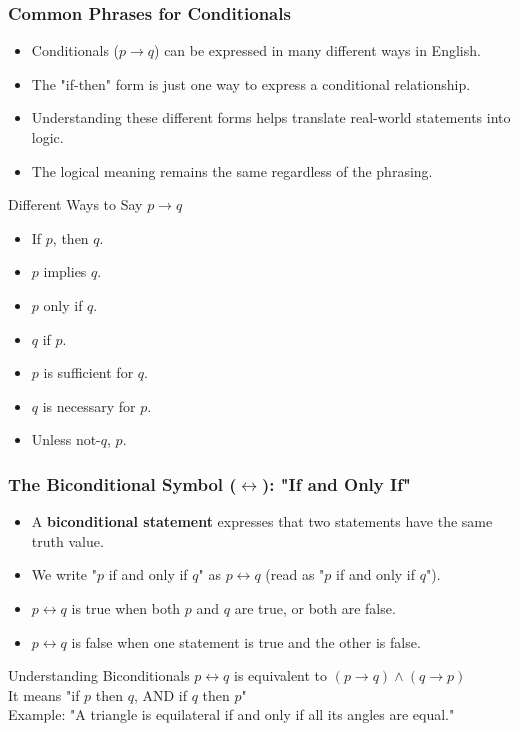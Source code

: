 \documentclass{beamer}
\begin{document}
        \begin{frame}
        \frametitle{Common Phrases for Conditionals}
        \begin{itemize}
            \item Conditionals ($p \rightarrow q$) can be expressed in many different ways in English.
            \item The "if-then" form is just one way to express a conditional relationship.
            \item Understanding these different forms helps translate real-world statements into logic.
            \item The logical meaning remains the same regardless of the phrasing.
        \end{itemize}
        
        \begin{block}{Different Ways to Say $p \rightarrow q$}
            \scriptsize
        \begin{itemize}
            \item If $p$, then $q$.
            \item $p$ implies $q$.
            \item $p$ only if $q$.
            \item $q$ if $p$.
            \item $p$ is sufficient for $q$.
            \item $q$ is necessary for $p$.
            \item Unless not-$q$, $p$.
        \end{itemize}
        \end{block}
        \end{frame}

        \begin{frame}
            \frametitle{The Biconditional Symbol ($\leftrightarrow$): "If and Only If"}
            \begin{itemize}
                \item A \textbf{biconditional statement} expresses that two statements have the same truth value.
                \item We write "$p$ if and only if $q$" as $p \leftrightarrow q$ (read as "$p$ if and only if $q$").
                \item $p \leftrightarrow q$ is true when both $p$ and $q$ are true, or both are false.
                \item $p \leftrightarrow q$ is false when one statement is true and the other is false.
            \end{itemize}
            
            \begin{block}{Understanding Biconditionals}
            $p \leftrightarrow q$ is equivalent to $(p \rightarrow q) \wedge (q \rightarrow p)$\\
            It means "if $p$ then $q$, AND if $q$ then $p$"\\
            Example: "A triangle is equilateral if and only if all its angles are equal."
            \end{block}
            \end{frame}
            
\end{document}
